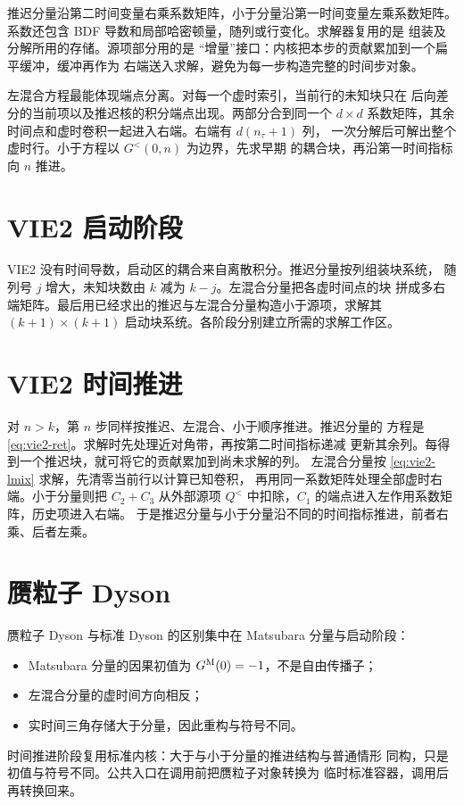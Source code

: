 推迟分量沿第二时间变量右乘系数矩阵，小于分量沿第一时间变量左乘系数矩阵。
系数还包含 BDF 导数和局部哈密顿量，随列或行变化。求解器复用的是
组装及分解所用的存储。源项部分用的是
“增量”接口：内核把本步的贡献累加到一个扁平缓冲，缓冲再作为
右端送入求解，避免为每一步构造完整的时间步对象。

左混合方程最能体现端点分离。对每一个虚时索引，当前行的未知块只在
后向差分的当前项以及推迟核的积分端点出现。两部分合到同一个 $d\times d$
系数矩阵，其余时间点和虚时卷积一起进入右端。右端有 $d(n_\tau+1)$ 列，
一次分解后可解出整个虚时行。小于方程以 $G^<(0,n)$ 为边界，先求早期
的耦合块，再沿第一时间指标向 $n$ 推进。

\section{VIE2 启动阶段}
\label{sec:vie2-start}

VIE2 没有时间导数，启动区的耦合来自离散积分。推迟分量按列组装块系统，
随列号 $j$ 增大，未知块数由 $k$ 减为 $k-j$。左混合分量把各虚时间点的块
拼成多右端矩阵。最后用已经求出的推迟与左混合分量构造小于源项，求解其
$(k+1)\times(k+1)$ 启动块系统。各阶段分别建立所需的求解工作区。

\section{VIE2 时间推进}
\label{sec:vie2-step}

对 $n>k$，第 $n$ 步同样按推迟、左混合、小于顺序推进。推迟分量的
方程是 \cref{eq:vie2-ret}。求解时先处理近对角带，再按第二时间指标递减
更新其余列。每得到一个推迟块，就可将它的贡献累加到尚未求解的列。
左混合分量按 \cref{eq:vie2-lmix} 求解，先清零当前行以计算已知卷积，
再用同一系数矩阵处理全部虚时右端。小于分量则把 $C_2+C_3$ 从外部源项
$Q^<$ 中扣除，$C_1$ 的端点进入左作用系数矩阵，历史项进入右端。
于是推迟分量与小于分量沿不同的时间指标推进，前者右乘、后者左乘。

\section{赝粒子 Dyson}
\label{sec:pseudo-dyson}

赝粒子 Dyson 与标准 Dyson 的区别集中在 Matsubara 分量与启动阶段：
\begin{itemize}
    \item Matsubara 分量的因果初值为 $G^{\mathrm{M}}(0)=-1$，不是自由传播子；
    \item 左混合分量的虚时间方向相反；
    \item 实时间三角存储大于分量，因此重构与符号不同。
\end{itemize}
时间推进阶段复用标准内核：大于与小于分量的推进结构与普通情形
同构，只是初值与符号不同。公共入口在调用前把赝粒子对象转换为
临时标准容器，调用后再转换回来。

